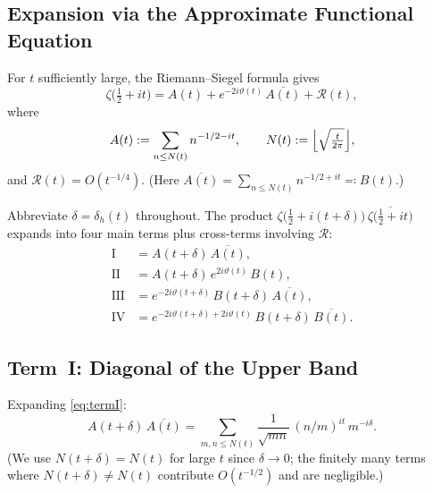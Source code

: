 \documentclass[11pt]{article}
\theoremstyle{plain}
\theoremstyle{definition}
\newcommand{\assign}{:=}
\begin{document}
\subsection*{Expansion via the Approximate Functional Equation}

For $t$ sufficiently large, the Riemann--Siegel formula gives
\begin{equation}\label{eq:AFE}
\zeta\bigl(\tfrac{1}{2}+it\bigr)
= A(t) + e^{-2i\vartheta(t)}\,\overline{A(t)} + \mathcal{R}(t),
\end{equation}
where
\begin{equation}\label{eq:A-def}
A(t) \assign \sum_{n\le N(t)} n^{-1/2-it},
\qquad
N(t) \assign \Bigl\lfloor\sqrt{\tfrac{t}{2\pi}}\Bigr\rfloor,
\end{equation}
and $\mathcal{R}(t) = O(t^{-1/4})$.
(Here $\overline{A(t)} = \sum_{n\le N(t)} n^{-1/2+it} \eqqcolon B(t)$.)

Abbreviate $\delta=\delta_h(t)$ throughout.
The product
$\zeta\bigl(\tfrac{1}{2}+i(t+\delta)\bigr)\,
 \overline{\zeta\bigl(\tfrac{1}{2}+it\bigr)}$
expands into four main terms plus cross-terms involving $\mathcal{R}$:
\begin{align}
\mathrm{I}   &= A(t+\delta)\,\overline{A(t)},
\label{eq:termI}\\
\mathrm{II}  &= A(t+\delta)\,e^{2i\vartheta(t)}\,B(t),
\label{eq:termII}\\
\mathrm{III} &= e^{-2i\vartheta(t+\delta)}\,B(t+\delta)\,\overline{A(t)},
\label{eq:termIII}\\
\mathrm{IV}  &= e^{-2i\vartheta(t+\delta)+2i\vartheta(t)}\,B(t+\delta)\,\overline{B(t)}.
\label{eq:termIV}
\end{align}

\subsection*{Term~I: Diagonal of the Upper Band}

Expanding \eqref{eq:termI}:
\begin{equation}\label{eq:termI-expand}
A(t+\delta)\,\overline{A(t)}
= \sum_{m,n\le N(t)} \frac{1}{\sqrt{mn}}\,(n/m)^{it}\,m^{-i\delta}.
\end{equation}
(We use $N(t+\delta)=N(t)$ for large $t$ since $\delta\to 0$;
the finitely many terms where $N(t+\delta)\ne N(t)$ contribute
$O(t^{-1/2})$ and are negligible.)
\end{document}
